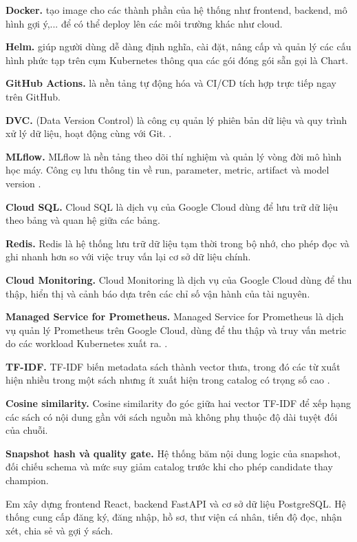\textbf{Docker.} tạo image cho các thành phần của hệ thống như frontend, backend, mô hình gợi ý,... để có thể deploy lên các môi trường khác như cloud.

\textbf{Helm.} giúp người dùng dễ dàng định nghĩa, cài đặt, nâng cấp và quản lý các cấu hình phức tạp trên cụm Kubernetes thông qua các gói đóng gói sẵn gọi là Chart.

\textbf{GitHub Actions.} là nền tảng tự động hóa và CI/CD tích hợp trực tiếp ngay trên GitHub.

\textbf{DVC.} (Data Version Control) là công cụ quản lý phiên bản dữ liệu và quy trình xử lý dữ liệu, hoạt động cùng với Git. \cite{dvc}.

\textbf{MLflow.} MLflow là nền tảng theo dõi thí nghiệm và quản lý vòng đời mô hình học máy. Công cụ lưu thông tin về run, parameter, metric, artifact và model version \cite{mlflow}.

\textbf{Cloud SQL.} Cloud SQL là dịch vụ của Google Cloud dùng để lưu trữ dữ liệu theo bảng và quan hệ giữa các bảng.

\textbf{Redis.} Redis là hệ thống lưu trữ dữ liệu tạm thời trong bộ nhớ, cho phép đọc và ghi nhanh hơn so với việc truy vấn lại cơ sở dữ liệu chính.

\textbf{Cloud Monitoring.} Cloud Monitoring là dịch vụ của Google Cloud dùng để thu thập, hiển thị và cảnh báo dựa trên các chỉ số vận hành của tài nguyên.

\textbf{Managed Service for Prometheus.} Managed Service for Prometheus là dịch vụ quản lý Prometheus trên Google Cloud, dùng để thu thập và truy vấn metric do các workload Kubernetes xuất ra. \cite{prometheus}.

\textbf{TF-IDF.} TF-IDF biến metadata sách thành vector thưa, trong đó các từ xuất hiện nhiều trong một sách nhưng ít xuất hiện trong catalog có trọng số cao \cite{sklearn}.

\textbf{Cosine similarity.} Cosine similarity đo góc giữa hai vector TF-IDF để xếp hạng các sách có nội dung gần với sách nguồn mà không phụ thuộc độ dài tuyệt đối của chuỗi.

\textbf{Snapshot hash và quality gate.} Hệ thống băm nội dung logic của snapshot, đối chiếu schema và mức suy giảm catalog trước khi cho phép candidate thay champion.

Em xây dựng frontend React, backend FastAPI và cơ sở dữ liệu PostgreSQL. Hệ thống cung cấp đăng ký, đăng nhập, hồ sơ, thư viện cá nhân, tiến độ đọc, nhận xét, chia sẻ và gợi ý sách.


